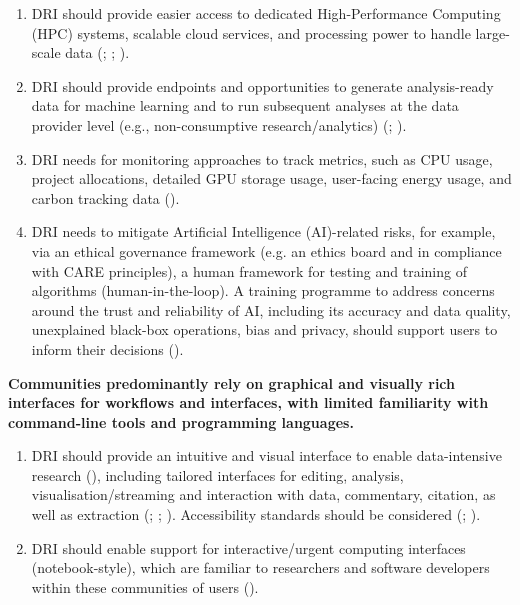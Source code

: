 \documentclass[11pt]{scrartcl}
\begin{document}
\begin{enumerate}[resume]
\item\label{itm:hpc} DRI should provide easier access to dedicated High-Performance Computing (HPC) systems, scalable cloud services, and processing power to handle large-scale data
(\cite[62]{de_roure_2022_4716148}; \cite[2]{bell_2025_17099176}; 
\cite[72]{shoaib_sufi_2023_7686348}).   

\item\label{itm:ana} DRI should provide endpoints and opportunities to generate analysis-ready data for machine learning and to run subsequent analyses at the data provider level (e.g., non-consumptive research/analytics) 
(\cite[4,66]{de_roure_2022_4716148}; \cite[5]{wrro203045}).

\item DRI needs for monitoring approaches to track metrics, such as CPU usage, project allocations, detailed GPU storage usage, user-facing energy usage, and carbon tracking data 
(\cite[14,15]{collier25}).  

\item\label{itm:aigov} DRI needs to mitigate Artificial Intelligence (AI)-related risks, for example, via an ethical governance framework (e.g. an ethics board and in compliance with CARE principles), a human framework for testing and training of algorithms (human-in-the-loop). A training programme to address concerns around the trust and reliability of AI, including its accuracy and data quality, unexplained black-box operations, bias and privacy, should support users to inform their decisions (\cite[4]{Zwiggelaar22}).   
\end{enumerate}

\noindent\textbf{Communities predominantly rely on graphical and visually rich interfaces for workflows and interfaces, with limited familiarity with command-line tools and programming languages.}

\begin{enumerate}[resume]
\item DRI should provide an intuitive and visual interface to enable data-intensive research 
(\cite[4]{wrro203045}), 
including tailored interfaces for editing, analysis, visualisation/streaming and interaction with data, commentary, citation, as well as extraction (\cite{Rodriguez22}; \cite[44]{de_roure_2022_4716148}; \cite[5]{wrro203045}). 
Accessibility standards should be considered 
(\cite[66]{de_roure_2022_4716148}; \cite[5]{wrro203045}).  

\item DRI should enable support for interactive/urgent computing interfaces (notebook-style), which are familiar to researchers and software developers within these communities of users (\cite[4]{bell_2025_17099176}). 
\end{enumerate}
\end{document}
